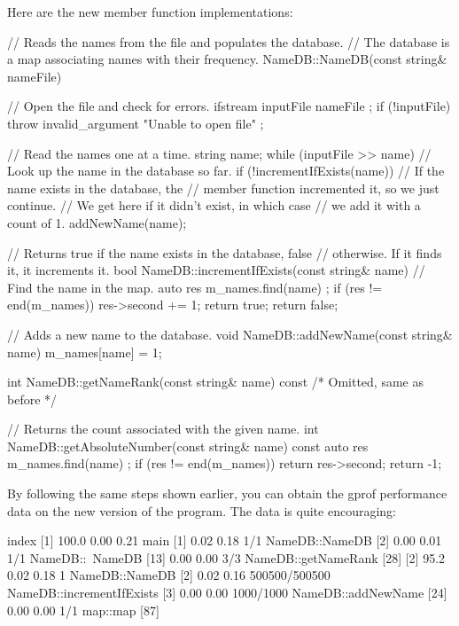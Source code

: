 Here are the new member function implementations:

\begin{cpp}
// Reads the names from the file and populates the database.
// The database is a map associating names with their frequency.
NameDB::NameDB(const string& nameFile)
{
    // Open the file and check for errors.
    ifstream inputFile { nameFile };
    if (!inputFile) {
        throw invalid_argument { "Unable to open file" };
    }

    // Read the names one at a time.
    string name;
    while (inputFile >> name) {
        // Look up the name in the database so far.
        if (!incrementIfExists(name)) {
            // If the name exists in the database, the
            // member function incremented it, so we just continue.
            // We get here if it didn't exist, in which case
            // we add it with a count of 1.
            addNewName(name);
        }
    }
}

// Returns true if the name exists in the database, false
// otherwise. If it finds it, it increments it.
bool NameDB::incrementIfExists(const string& name)
{
    // Find the name in the map.
    auto res { m_names.find(name) };
    if (res != end(m_names)) {
        res->second += 1;
        return true;
    }
    return false;
}

// Adds a new name to the database.
void NameDB::addNewName(const string& name)
{
    m_names[name] = 1;
}

int NameDB::getNameRank(const string& name) const { /* Omitted, same as before */ }

// Returns the count associated with the given name.
int NameDB::getAbsoluteNumber(const string& name) const
{
    auto res { m_names.find(name) };
    if (res != end(m_names)) {
        return res->second;
    }
    return -1;
}
\end{cpp}


By following the same steps shown earlier, you can obtain the gprof performance data on the new version of the program. The data is quite encouraging:


\begin{shell}
index   %
[1]     100.0   0.00     0.21                 main [1]
                0.02     0.18      1/1        NameDB::NameDB [2]
                0.00     0.01      1/1        NameDB::~NameDB [13]
                0.00     0.00      3/3        NameDB::getNameRank [28]
[2]      95.2   0.02     0.18      1          NameDB::NameDB [2]
                0.02     0.16 500500/500500   NameDB::incrementIfExists
[3]             0.00     0.00   1000/1000     NameDB::addNewName [24]
                0.00     0.00      1/1        map::map [87]
\end{shell}

